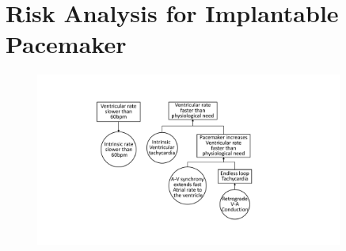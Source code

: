 %
%
\section{Risk Analysis for Implantable Pacemaker}

\begin{figure}[!t]
		\centering
		\includegraphics[width=0.9\textwidth]{figs/risk_requirements.pdf}
		\caption{\small }
		\label{fig:risk_req}
\end{figure}
